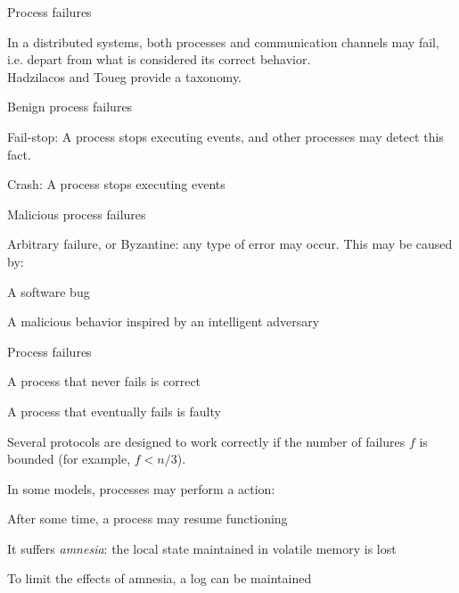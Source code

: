 \begin{frame}{Process failures}

In a distributed systems, both processes and communication channels may fail, i.e. depart from
what is considered its correct behavior.\\
Hadzilacos and Toueg provide a taxonomy. 

\begin{block}{Benign process failures}
\BI
\item \alert{Fail-stop}: A process stops executing events, and other processes may detect this fact.
\item \alert{Crash}: A process stops executing events
\EI
\end{block}

\begin{block}{Malicious process failures}
\BI
\item \alert{Arbitrary failure}, or Byzantine: any type of error may occur. This may be caused by:
  \BI
  \item A software bug
  \item A malicious behavior inspired by an intelligent adversary
  \EI
\EI
\end{block}

\end{frame}

\begin{frame}{Process failures}
	

\BIL
\item A process that never fails is \alert{correct}
\item A process that eventually fails is \alert{faulty}
\item Several protocols are designed to work correctly if the number
  of failures $f$ is bounded (for example, $f < n/3$).
\item In some models, processes may perform a  action:
  \BI
  \item After some time, a process may resume functioning
  \item It suffers {\em amnesia}: the local state maintained in volatile
    memory is lost
  \item To limit the effects of amnesia, a log can be maintained
 \EI
\EIL

\end{frame}

